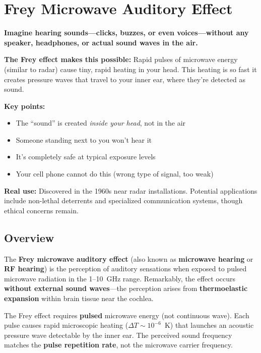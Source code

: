 \chapter{Frey Microwave Auditory Effect}
\label{ch:frey-microwave-auditory-effect}

\begin{nontechnical}
\textbf{Imagine hearing sounds---clicks, buzzes, or even voices---without any speaker, headphones, or actual sound waves in the air.}

\textbf{The Frey effect makes this possible:} Rapid pulses of microwave energy (similar to radar) cause tiny, rapid heating in your head. This heating is so fast it creates pressure waves that travel to your inner ear, where they're detected as sound.

\textbf{Key points:}
\begin{itemize}
\item The ``sound'' is created \emph{inside your head}, not in the air
\item Someone standing next to you won't hear it
\item It's completely safe at typical exposure levels
\item Your cell phone cannot do this (wrong type of signal, too weak)
\end{itemize}

\textbf{Real use:} Discovered in the 1960s near radar installations. Potential applications include non-lethal deterrents and specialized communication systems, though ethical concerns remain.
\end{nontechnical}

\section{Overview}

The \textbf{Frey microwave auditory effect} (also known as \textbf{microwave hearing} or \textbf{RF hearing}) is the perception of auditory sensations when exposed to pulsed microwave radiation in the 1--10~GHz range. Remarkably, the effect occurs \textbf{without external sound waves}---the perception arises from \textbf{thermoelastic expansion} within brain tissue near the cochlea.

\begin{keyconcept}
The Frey effect requires \textbf{pulsed} microwave energy (not continuous wave). Each pulse causes rapid microscopic heating ($\Delta T \sim 10^{-6}$~K) that launches an acoustic pressure wave detectable by the inner ear. The perceived sound frequency matches the \textbf{pulse repetition rate}, not the microwave carrier frequency.
\end{keyconcept}

